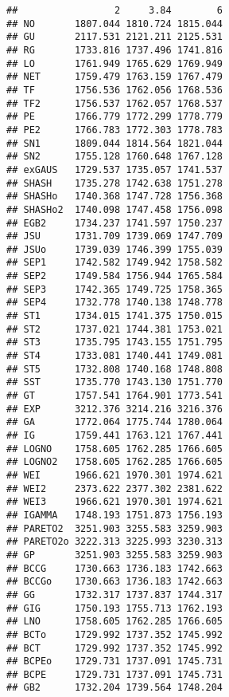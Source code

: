 \begin{verbatim}
##                 2     3.84        6
## NO       1807.044 1810.724 1815.044
## GU       2117.531 2121.211 2125.531
## RG       1733.816 1737.496 1741.816
## LO       1761.949 1765.629 1769.949
## NET      1759.479 1763.159 1767.479
## TF       1756.536 1762.056 1768.536
## TF2      1756.537 1762.057 1768.537
## PE       1766.779 1772.299 1778.779
## PE2      1766.783 1772.303 1778.783
## SN1      1809.044 1814.564 1821.044
## SN2      1755.128 1760.648 1767.128
## exGAUS   1729.537 1735.057 1741.537
## SHASH    1735.278 1742.638 1751.278
## SHASHo   1740.368 1747.728 1756.368
## SHASHo2  1740.098 1747.458 1756.098
## EGB2     1734.237 1741.597 1750.237
## JSU      1731.709 1739.069 1747.709
## JSUo     1739.039 1746.399 1755.039
## SEP1     1742.582 1749.942 1758.582
## SEP2     1749.584 1756.944 1765.584
## SEP3     1742.365 1749.725 1758.365
## SEP4     1732.778 1740.138 1748.778
## ST1      1734.015 1741.375 1750.015
## ST2      1737.021 1744.381 1753.021
## ST3      1735.795 1743.155 1751.795
## ST4      1733.081 1740.441 1749.081
## ST5      1732.808 1740.168 1748.808
## SST      1735.770 1743.130 1751.770
## GT       1757.541 1764.901 1773.541
## EXP      3212.376 3214.216 3216.376
## GA       1772.064 1775.744 1780.064
## IG       1759.441 1763.121 1767.441
## LOGNO    1758.605 1762.285 1766.605
## LOGNO2   1758.605 1762.285 1766.605
## WEI      1966.621 1970.301 1974.621
## WEI2     2373.622 2377.302 2381.622
## WEI3     1966.621 1970.301 1974.621
## IGAMMA   1748.193 1751.873 1756.193
## PARETO2  3251.903 3255.583 3259.903
## PARETO2o 3222.313 3225.993 3230.313
## GP       3251.903 3255.583 3259.903
## BCCG     1730.663 1736.183 1742.663
## BCCGo    1730.663 1736.183 1742.663
## GG       1732.317 1737.837 1744.317
## GIG      1750.193 1755.713 1762.193
## LNO      1758.605 1762.285 1766.605
## BCTo     1729.992 1737.352 1745.992
## BCT      1729.992 1737.352 1745.992
## BCPEo    1729.731 1737.091 1745.731
## BCPE     1729.731 1737.091 1745.731
## GB2      1732.204 1739.564 1748.204
\end{verbatim}

\begin{Shaded}
\begin{Highlighting}[]
\OtherTok{\textless{}{-}} \NormalTok{, }\NormalTok{)}
\end{Highlighting}
\end{Shaded}

